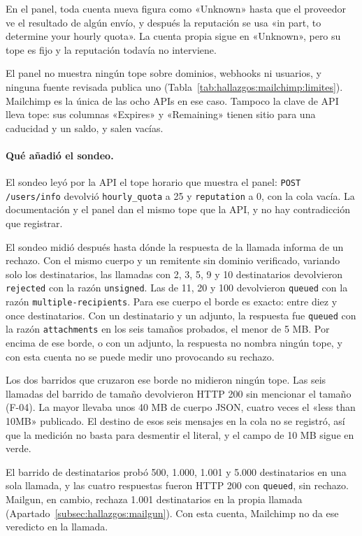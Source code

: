En el panel, toda cuenta
nueva figura como «Unknown» hasta que el proveedor ve el resultado de algún envío, y
después la reputación se usa «in part, to determine your hourly quota». La cuenta
propia sigue en «Unknown», pero su tope es fijo y la reputación todavía no
interviene.

El panel no muestra ningún tope sobre dominios, webhooks ni usuarios, y ninguna fuente
revisada publica uno (Tabla~\ref{tab:hallazgos:mailchimp:limites}). Mailchimp es la
única de las ocho APIs en ese caso. Tampoco la clave de API lleva tope:
sus columnas «Expires» y «Remaining» tienen sitio para una caducidad y un saldo, y
salen vacías.

\paragraph{Qué añadió el sondeo.} El sondeo leyó por la API el tope horario que
muestra el panel: \texttt{POST /users/info} devolvió \texttt{hourly\_quota} a 25 y
\texttt{reputation} a 0, con la cola vacía. La documentación y el panel dan el mismo
tope que la API, y no hay contradicción que registrar.

El sondeo midió después hasta dónde la respuesta de la llamada informa de un
rechazo. Con el mismo cuerpo y un remitente sin dominio verificado, variando solo los
destinatarios, las llamadas con 2, 3, 5, 9 y 10 destinatarios devolvieron
\texttt{rejected} con la razón \texttt{unsigned}. Las de 11, 20 y 100 devolvieron
\texttt{queued} con la razón \texttt{multiple-}\allowbreak\texttt{recipients}. Para ese cuerpo el borde
es exacto: entre diez y once destinatarios. Con un destinatario y un adjunto, la
respuesta fue \texttt{queued} con la razón \texttt{attachments} en los seis tamaños
probados, el menor de 5 MB. Por encima de ese borde, o con un adjunto, la respuesta
no nombra ningún tope, y con esta cuenta no se puede medir uno provocando su rechazo.

Los dos barridos que cruzaron ese borde no midieron ningún tope. Las seis llamadas
del barrido de tamaño devolvieron HTTP 200 sin mencionar el tamaño (F-04). La mayor
llevaba unos 40 MB de cuerpo JSON, cuatro veces el «less than 10MB» publicado. El
destino de esos seis mensajes en la cola no se registró, así que la medición no
basta para desmentir el literal, y el campo de 10 MB sigue en verde.

El barrido de destinatarios probó 500, 1.000, 1.001 y 5.000 destinatarios en una
sola llamada, y las cuatro respuestas fueron HTTP 200 con \texttt{queued}, sin
rechazo. Mailgun, en cambio, rechaza 1.001 destinatarios en la propia llamada
(Apartado~\ref{subsec:hallazgos:mailgun}). Con esta cuenta,
Mailchimp no da ese veredicto en la llamada.


